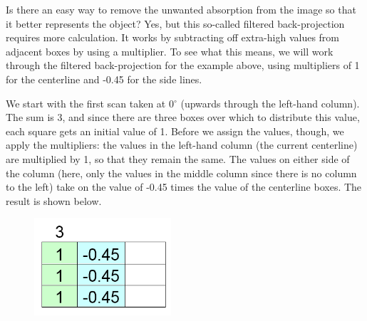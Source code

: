 Is there an easy way to remove the unwanted absorption from the image so that it better represents the object?  Yes, but this so-called filtered back-projection requires more calculation.  It works by subtracting off extra-high values from adjacent boxes by using a multiplier.  To see what this means, we will work through the filtered back-projection for the example above, using multipliers of 1 for the centerline and -0.45 for the side lines.

We start with the first scan taken at 0$^{\circ}$ (upwards through the left-hand column).  The sum is 3, and since there are three boxes over which to distribute this value, each square gets an initial value of 1.  Before we assign the values, though, we apply the multipliers: the values in the left-hand column (the current centerline) are multiplied by 1, so that they remain the same.  The values on either side of the column (here, only the values in the middle column since there is no column to the left) take on the value of -0.45 times the value of the centerline boxes.  The result is shown below.\begin{figure}[!htb]
	\centering
	\includegraphics[width=2.0in]{./figures/Topic10/CTFilter1.png}
	\label{CTFil1}
\end{figure} 

